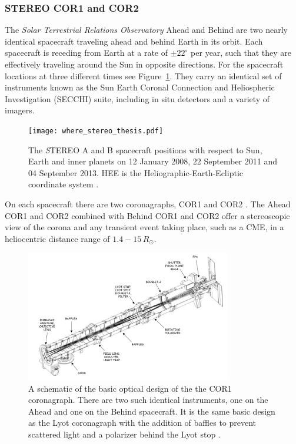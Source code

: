 \subsubsection{STEREO COR1 and COR2}\label{sec:22}
The \emph{Solar Terrestrial Relations Observatory} \citep[\emph{STEREO};][]{kai08} Ahead and Behind are two nearly identical spacecraft traveling ahead and behind Earth in its orbit. Each spacecraft is receding from Earth at a rate of $\pm22^{\circ}$ per year, such that they are effectively traveling around the Sun in opposite directions. For the spacecraft locations at three different times see Figure~\ref{fig:where_str}. They carry an identical set of instruments known as the Sun Earth Coronal Connection and Heliospheric Investigation (SECCHI) suite, including in situ detectors and a variety of imagers.
\begin{figure}
\centering
\texttt{[image: where\_stereo\_thesis.pdf]}
\caption[STEREO spacecraft positions]{The {\emph STEREO} A and B spacecraft positions with respect to Sun, Earth and inner planets on 12 January 2008, 22 September 2011 and 04 September 2013. HEE is the Heliographic-Earth-Ecliptic coordinate system \citep{thompson2006}.}
\label{fig:where_str}
\end{figure}
On each spacecraft there are two coronagraphs, COR1 and COR2 \citep{how08}. The Ahead COR1 and COR2 combined with Behind COR1 and COR2 offer a stereoscopic view of the corona and any transient event taking place, such as a CME, in a heliocentric distance range of $1.4-15\,R_{\odot}$.
\begin{figure}[!t]
\begin{center}
\includegraphics[width=0.8\textwidth, trim=0cm 0cm 0cm 1cm]{images/COR1_design}
\caption[The COR1 coronagraph]{A schematic of the basic optical design of the the COR1 coronagraph. There are two such identical instruments, one on the Ahead and one on the Behind spacecraft. It is the same basic design as the Lyot coronagraph with the addition of baffles to prevent scattered light and a polarizer behind the Lyot stop \citep{thomp2008}.}
\label{fig:COR1_design}
\end{center}
\end{figure}
